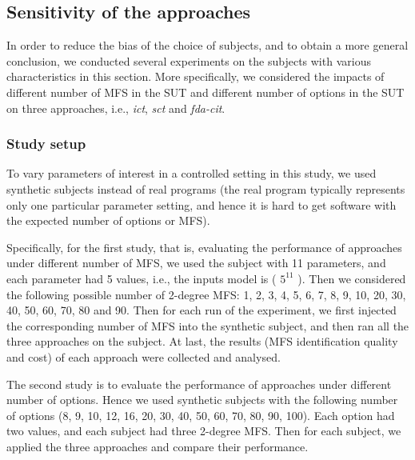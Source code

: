 \documentclass[10pt,journal,compsoc]{IEEEtran}
\begin{document}
\subsection{Sensitivity of the approaches}\label{sec:emprical:Sensitivity}
In order to reduce the bias of the choice of subjects, and to obtain a more general conclusion, we conducted several experiments on the subjects with various characteristics in this section.  More specifically, we considered the impacts of different number of MFS in the SUT and different number of options in the SUT on three approaches, i.e., \emph{ict}, \emph{sct} and \emph{fda-cit}.

\subsubsection{Study setup}
To vary parameters of interest in a controlled setting in this study, we used synthetic subjects instead of real programs (the real program typically represents only one particular parameter setting, and hence it is hard to get software with the expected number of options or MFS).

Specifically, for the first study, that is, evaluating the performance of approaches under different number of MFS, we used the subject with 11 parameters, and each parameter had 5 values, i.e., the inputs model is ( $5^{11}$ ). Then we considered the following possible number of 2-degree MFS: 1, 2, 3, 4, 5, 6, 7, 8, 9, 10, 20, 30, 40, 50, 60, 70, 80 and 90. Then for each run of the experiment, we first injected the corresponding number of MFS into the synthetic subject, and then ran all the three approaches on the subject. At last, the results (MFS identification quality and cost) of each approach were collected and analysed.

The second study is to evaluate the performance of approaches under different number of options. Hence we used synthetic subjects with the following number of options (8, 9, 10, 12, 16, 20, 30, 40, 50, 60, 70, 80, 90, 100). Each option had two values, and each subject had three 2-degree MFS. Then for each subject, we applied the three approaches and compare their performance.
\end{document}

